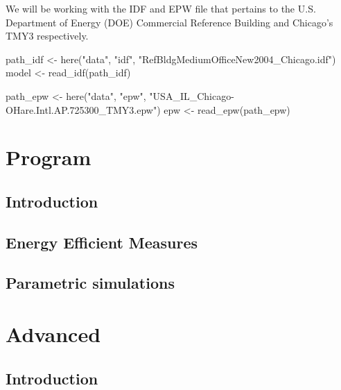\documentclass[
]{book}
\newenvironment{Shaded}{\begin{snugshade}}{\end{snugshade}}
\newcommand{\FunctionTok}[1]{\textcolor[rgb]{0.00,0.00,0.00}{#1}}
\newcommand{\NormalTok}[1]{#1}
\newcommand{\OtherTok}[1]{\textcolor[rgb]{0.56,0.35,0.01}{#1}}
\newcommand{\StringTok}[1]{\textcolor[rgb]{0.31,0.60,0.02}{#1}}
\begin{document}
We will be working with the IDF and EPW file that pertains to the U.S. Department of Energy (DOE) Commercial Reference Building and Chicago's TMY3 respectively.

\begin{Shaded}
\begin{Highlighting}[]
\NormalTok{path\_idf }\OtherTok{\textless{}{-}} \FunctionTok{here}\NormalTok{(}\StringTok{"data"}\NormalTok{, }\StringTok{"idf"}\NormalTok{, }\StringTok{"RefBldgMediumOfficeNew2004\_Chicago.idf"}\NormalTok{)}
\NormalTok{model }\OtherTok{\textless{}{-}} \FunctionTok{read\_idf}\NormalTok{(path\_idf)}

\NormalTok{path\_epw }\OtherTok{\textless{}{-}} \FunctionTok{here}\NormalTok{(}\StringTok{"data"}\NormalTok{, }\StringTok{"epw"}\NormalTok{, }\StringTok{"USA\_IL\_Chicago{-}OHare.Intl.AP.725300\_TMY3.epw"}\NormalTok{)}
\NormalTok{epw }\OtherTok{\textless{}{-}} \FunctionTok{read\_epw}\NormalTok{(path\_epw)}
\end{Highlighting}
\end{Shaded}

\hypertarget{part-program}{%
\part{Program}\label{part-program}}

\hypertarget{program}{%
\chapter{Introduction}\label{program}}

\hypertarget{energy-efficient-measures}{%
\chapter{Energy Efficient Measures}\label{energy-efficient-measures}}

\hypertarget{parametric-simulations}{%
\chapter{Parametric simulations}\label{parametric-simulations}}

\hypertarget{part-advanced}{%
\part{Advanced}\label{part-advanced}}

\hypertarget{advanced}{%
\chapter{Introduction}\label{advanced}}
\end{document}
